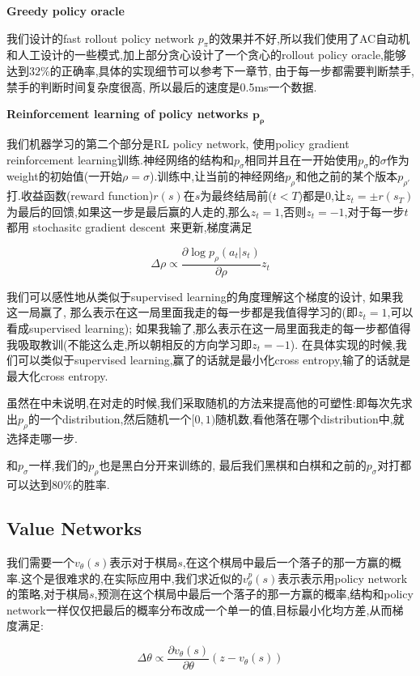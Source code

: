 \documentclass[twocolumn]{article}
\begin{document}
\noindent \textbf{Greedy policy oracle}

我们设计的fast rollout policy network $p_\pi$的效果并不好,所以我们使用了AC自动机和人工设计的一些模式,加上部分贪心设计了一个贪心的rollout policy oracle,能够达到$32\%$的正确率,具体的实现细节可以参考下一章节, 由于每一步都需要判断禁手, 禁手的判断时间复杂度很高, 所以最后的速度是0.5ms一个数据.

\noindent \textbf{Reinforcement learning of policy networks $\bm{p_\rho}$}

我们机器学习的第二个部分是RL policy network, 使用policy gradient reinforcement learning训练.神经网络的结构和$p_\sigma$相同并且在一开始使用$p_\sigma$的$\sigma$作为weight的初始值(一开始$\rho = \sigma$).训练中,让当前的神经网络$p_\rho$和他之前的某个版本$p_{\rho'}$打.收益函数(reward function)$r(s)$在$s$为最终结局前($t < T$)都是0,让$z_t=\pm r(s_T)$为最后的回馈,如果这一步是最后赢的人走的,那么$z_t = 1$,否则$z_t = -1$,对于每一步$t$都用 stochasitc gradient descent 来更新,梯度满足

\[
\Delta\rho \propto \frac{\partial\log p_\rho(a_t|s_t)}{\partial \rho}z_t
\]

我们可以感性地从类似于supervised learning的角度理解这个梯度的设计, 如果我这一局赢了, 那么表示在这一局里面我走的每一步都是我值得学习的(即$z_t=1$,可以看成supervised learning); 如果我输了,那么表示在这一局里面我走的每一步都值得我吸取教训(不能这么走,所以朝相反的方向学习即$z_t=-1$). 在具体实现的时候,我们可以类似于supervised learning,赢了的话就是最小化cross entropy,输了的话就是最大化cross entropy.

虽然在\cite{alphago}中未说明,在对走的时候,我们采取随机的方法来提高他的可塑性:即每次先求出$p_\rho$的一个distribution,然后随机一个$[0,1)$随机数,看他落在哪个distribution中,就选择走哪一步.

和$p_\sigma$一样,我们的$p_\rho$也是黑白分开来训练的, 最后我们黑棋和白棋和之前的$p_\sigma$对打都可以达到$80\%$的胜率.

\subsection{Value Networks}

我们需要一个$v_\theta(s)$表示对于棋局$s$,在这个棋局中最后一个落子的那一方赢的概率.这个是很难求的,在实际应用中,我们求近似的$v^p_\theta(s)$表示表示用policy network的策略,对于棋局$s$,预测在这个棋局中最后一个落子的那一方赢的概率,结构和policy network一样仅仅把最后的概率分布改成一个单一的值,目标最小化均方差,从而梯度满足: 

\[
\Delta\theta \propto \frac{\partial v_\theta(s)}{\partial \theta}(z - v_\theta(s))
\]
\end{document}
